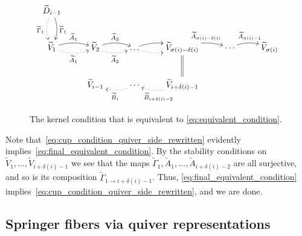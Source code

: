 \documentclass[11pt,reqno]{amsart}
\numberwithin{equation}{section}
\theoremstyle{definition}
\newcommand{\tA}{\widetilde{A}}
\newcommand{\tB}{\widetilde{B}}
\newcommand{\tD}{\widetilde{D}}
\newcommand{\tGa}{\widetilde{\Gamma}}
\newcommand{\tV}{\widetilde{V}}
\begin{document}
\begin{figure}[ht!]
\caption{The kernel condition that is equivalent to \eqref{eq:equivalent_condition}.}
\label{fig:cupeq}
\[ 
\xymatrix@C=25pt@R=25pt{
{\tD_{i-1}}  
	\ar@/^/[d]^{\tGa_1}
	\ar@/_/@{.>}[d]_{\tGa_1}
\\
{\tV_{1}}
	\ar@/^/[r]^{\tA_{1}}
	\ar@/_/@{.>}[r]_{\tA_{1}}  
&
{\tV_{2}}
	\ar@/^/[r]^{\tA_{2}}
	\ar@/_/@{.>}[r]_{\tA_{2}}  
&
\dots  
	\ar@/^/[r]
	\ar@/_/@{.>}[r]  
	&
	\ar@{=}[d]
{\tV_{\sigma(i)-\delta(i)}}  
	\ar@/^/[r]^{\tA_{\sigma(i)-\delta(i)}}
	& 
	\cdots
   \ar@/^/[r]^{\tA_{\sigma(i)-1}}
	& 
{\tV_{\sigma(i)}} 
\\
&
{\tV_{i-1}}  
	&
	\ar@/^/@{.>}[l]^{\tB_{i}}   
	\cdots
	&
	\ar@/^/@{.>}[l]^{\tB_{i+\delta(i)-2}}
{\tV_{i+\delta(i)-1}}  
	& 
	& 
}
\] 
\end{figure}

Note that~\eqref{eq:cup_condition_quiver_side_rewritten} evidently implies~\eqref{eq:final_equivalent_condition}. 
By the stability conditions on $\tV_1, \ldots, \tV_{i+\delta(i) -1}$ we see that the maps $\tGa_1, \tA_1, \ldots, \tA_{i+\delta(i)-2}$ are all surjective, and so is its composition $\tGa_{1\to i+\delta(i)-1}$. 
Thus, \eqref{eq:final_equivalent_condition} implies~\eqref{eq:cup_condition_quiver_side_rewritten}, and we are done.
\endproof
\subsection{Springer fibers via quiver representations} \label{sec:hell}
\end{document}
